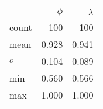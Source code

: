 \begin{tabular}{lrr}
\toprule
         & $\phi$ &  $\lambda$   \\
\midrule
count    &    100 &   100  \\
mean     &  0.928 &   0.941 \\
$\sigma$ &  0.104 &   0.089 \\
min      &  0.560 &   0.566 \\
max      &  1.000 &   1.000 \\
\bottomrule
\end{tabular}
